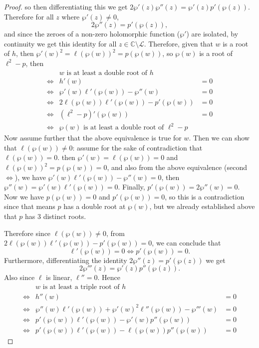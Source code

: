 \documentclass{article}
\theoremstyle{definition}
\theoremstyle{definition}
\theoremstyle{definition}
\begin{document}
\begin{proof}
so then differentiating this we get $2\wp'(z)\wp''(z)=\wp'(z)p'(\wp(z))$. Therefore for all $z$ where $\wp'(z)\neq0$, 
$$2\wp''(z)=p'(\wp(z)),$$
and since the zeroes of a non-zero holomorphic function ($\wp'$) are isolated, by continuity we get this identity for all $z\in\mathbb C\setminus\mathcal L$. Therefore, given that $w$ is a root of $h$, then $\wp'(w)^2=\ell(\wp(w))^2=p(\wp(w))$, so $\wp(w)$ is a root of $\ell^2-p$, then
\begin{align*}
&\text{$w$ is at least a double root of $h$}\\
   \iff&h'(w)&=0\\ 
   \iff& \wp'(w)\ell'(\wp(w))-\wp''(w)&=0\\ 
   \iff&2\ell(\wp(w))\ell'(\wp(w))-p'(\wp(w))&=0\\
   \iff&(\ell^2-p)'(\wp(w))&=0\\
   \iff&\text{$\wp(w)$ is at least a double root of $\ell^2-p$}
\end{align*}
Now assume further that the above equivalence is true for $w$. Then we can show that $\ell(\wp(w))\neq0$: assume for the sake of contradiction that $\ell(\wp(w))=0$. then $\wp'(w)=\ell(\wp(w))=0$ and $\ell(\wp(w))^2=p(\wp(w))=0$, and also from the above equivalence (second $\iff$), we have $\wp'(w)\ell'(\wp(w))-\wp''(w)=0$, then $\wp''(w)=\wp'(w)\ell'(\wp(w))=0$. Finally, $p'(\wp(w))=2\wp''(w)=0$. Now we have $p(\wp(w))=0$ and $p'(\wp(w))=0$, so this is a contradiction since that means $p$ has a double root at $\wp(w)$, but we already established above that $p$ has $3$ distinct roots. 

Therefore since $\ell(\wp(w))\neq0$, from $2\ell(\wp(w))\ell'(\wp(w))-p'(\wp(w))=0$, we can conclude that 
$$\ell'(\wp(w))=0\iff p'(\wp(w))=0.$$
Furthermore, differentiating the identity $2\wp''(z)=p'(\wp(z))$ we get $$2\wp'''(z)=\wp'(z)p''(\wp(z)).$$
Also since $\ell$ is linear, $\ell''=0$. Hence
\begin{align*}
    &\text{$w$ is at least a triple root of $h$}\\
    \iff &h''(w)&=0\\
    \iff &\wp''(w)\ell'(\wp(w))+\wp'(w)^2\ell''(\wp(w))-\wp'''(w)&=0\\
    \iff &p'(\wp(w))\ell'(\wp(w))-\wp'(w)p''(\wp(w))&=0\\
    \iff &p'(\wp(w))\ell'(\wp(w))-\ell(\wp(w))p''(\wp(w))&=0
\end{align*}


\end{proof}
\end{document}
